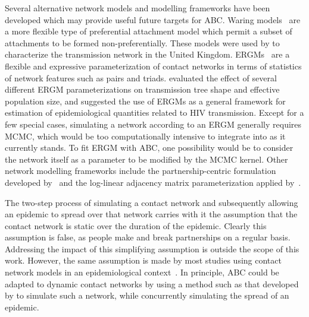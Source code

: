 Several alternative network models and modelling frameworks have been developed
which may provide useful future targets for \gls{ABC}. Waring
models~\autocite{irwin1963place,handcock2004likelihood} are a more flexible
type of preferential attachment model which permit a subset of attachments to
be formed non-preferentially. These models were used by
\textcite{brown2011transmission} to characterize the transmission network in
the United Kingdom. \Glspl{ERGM}~\autocite{robins2007introduction} are a
flexible and expressive parameterization of contact networks in terms of
statistics of network features such as pairs and triads.
\textcite{goodreau2006assessing} evaluated the effect of several different
\gls{ERGM} parameterizations on transmission tree shape and effective
population size, and suggested the use of \glspl{ERGM} as a general framework
for estimation of epidemiological quantities related to \gls{HIV} transmission.
Except for a few special cases, simulating a network according to an \gls{ERGM}
generally requires \gls{MCMC}, which would be too computationally intensive to
integrate into  as it currently stands. To fit \gls{ERGM} with
\gls{ABC}, one possibility would be to consider the network
itself as a parameter to be modified by the \gls{MCMC} kernel.  Other network
modelling frameworks include the partnership-centric formulation developed
by~\textcite{eames2002modeling} and the log-linear adjacency matrix
parameterization applied by~\textcite{morris1993epidemiology}.

The two-step process of simulating a contact network and subsequently allowing
an epidemic to spread over that network carries with it the assumption that the
contact network is static over the duration of the epidemic. Clearly this
assumption is false, as people make and break partnerships on a regular basis.
Addressing the impact of this simplifying assumption is outside the scope of
this work. However, the same assumption is made by most studies using contact
network models in an epidemiological context~\autocite{welch2011statistical,
bansal2007individual}. In principle, \gls{ABC} could be adapted
to dynamic contact networks by using a method such as that developed by
\textcite{robinson2012dynamics} to simulate such a network, while concurrently
simulating the spread of an epidemic.

